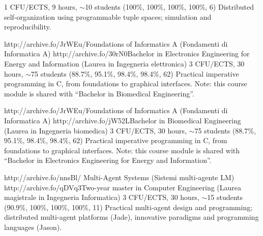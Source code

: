 \begin{outerlist}
        {1 CFU/ECTS, 9 hours, $\sim$10 students}
        {(100\%, 100\%, 100\%, 100\%, 6)}
        {Distributed self-organization using programmable tuple spaces; simulation and reproducibility.}
    \item[2014/15]
        \unibocourse
        {http://archive.fo/JrWEu/}{Foundations of Informatics A (Fondamenti di Informatica A)}
        {http://archive.fo/30rN0}{Bachelor in Electronics Engineering for Energy and Information (Laurea in Ingegneria elettronica)}
        {3 CFU/ECTS, 30 hours, $\sim$75 students}
        {(88.7\%, 95.1\%, 98.4\%, 98.4\%, 62)}
        {
            Practical imperative programming in C, from foundations to graphical interfaces.
            Note: this course module is shared with ``Bachelor in Biomedical Engineering''.
        }
    \item[2014/15]
        \unibocourse
        {http://archive.fo/JrWEu/}{Foundations of Informatics A (Fondamenti di Informatica A)}
        {http://archive.fo/jW52L}{Bachelor in Biomedical Engineering (Laurea in Ingegneria biomedica)}
        {3 CFU/ECTS, 30 hours, $\sim$75 students}
        {(88.7\%, 95.1\%, 98.4\%, 98.4\%, 62)}
        {
            Practical imperative programming in C, from foundations to graphical interfaces.
            Note: this course module is shared with ``Bachelor in Electronics Engineering for Energy and Information''.
        }
    \item[2011/12]
        \unibocourse
        {http://archive.fo/nnsBl/}
        {Multi-Agent Systems (Sistemi multi-agente LM)}
        {http://archive.fo/qDVq3}{Two-year master in Computer Engineering (Laurea magistrale in Ingegneria Informatica)}
        {3 CFU/ECTS, 30 hours, $\sim$15 students}
        {(90.9\%, 100\%, 100\%, 100\%, 11)}
        {Practical multi-agent design and programming; distributed multi-agent platforms (Jade), innovative paradigms and programming languages (Jason).}
\end{outerlist}

